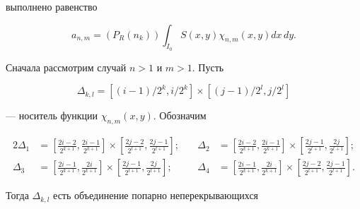 выполнено равенство


$$


a_{n,m}=(P_{R}(n_{k}))\int_{I_{0}}S(x,y)\chi_{n,m}(x,y)dx\,dy.


$$





Сначала рассмотрим случай $n>1$ и $m>1$. Пусть 


$$


\Delta _{k,l}=[(i-1)/2^{k},i/2^{k}]\times


[(j-1)/2^{l},j/2^{l}]


$$


--- носитель функции $\chi_{n,m}(x,y)$. Обозначим


\begin{alignat*}{2}


\Delta _{1}&=\left[\displaystyle\frac{2i-2}{2^{k+1}},


\displaystyle\frac{2i-1}{2^{k+1}}\right]\times


\left[\displaystyle\frac{2j-2}{2^{l+1}},


\displaystyle\frac{2j-1}{2^{l+1}}\right]; &\quad 


\Delta _{2}&=\left[\displaystyle\frac{2i-2}{2^{k+1}},


\displaystyle\frac{2i-1}{2^{k+1}}\right]\times


\left[\displaystyle\frac{2j-1}{2^{l+1}},


\displaystyle\frac{2j}{2^{l+1}}\right];\\


%


\Delta _{3}&=\left[\displaystyle\frac{2i-1}{2^{k+1}},


\displaystyle\frac{2i}{2^{k+1}}\right]\times


\left[\displaystyle\frac{2j-1}{2^{l+1}},


\displaystyle\frac{2j}{2^{l+1}}\right]; &\quad


\Delta _{4}&=\left[\displaystyle\frac{2i-1}{2^{k+1}},


\displaystyle\frac{2i}{2^{k+1}}\right]\times


\left[\displaystyle\frac{2j-2}{2^{l+1}},


\displaystyle\frac{2j-1}{2^{l+1}}\right].


\end{alignat*}





Тогда $\Delta _{k,l}$ есть объединение попарно неперекрывающихся



